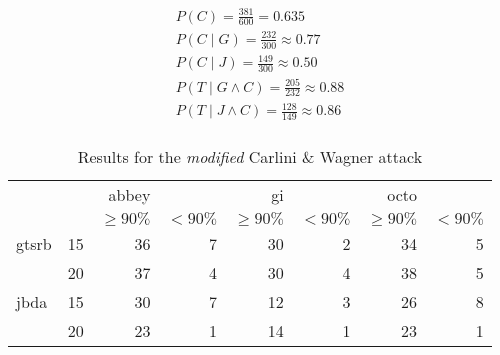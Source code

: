 \begin{align}
P(C) = \frac{381}{600} = 0.635\\[1ex]
P(C \mid G) = \frac{232}{300} \approx 0.77\\[1ex]
P(C \mid J) = \frac{149}{300} \approx 0.50\\[1ex]
P(T \mid G \wedge C) = \frac{205}{232} \approx 0.88\\[1ex]
P(T \mid J \wedge C) = \frac{128}{149} \approx 0.86\\[1ex]
\end{align}

\begin{table}
\begin{tabular}{l l | r r | r r | r r}
& & abbey & & gi & & octo & \\[1ex]
& & \footnotesize$\geq90\%$ & \footnotesize$<90\%$ & \footnotesize$\geq90\%$ & \footnotesize$<90\%$ & \footnotesize$\geq90\%$ & \footnotesize$<90\%$ \\[1ex]
\hline
gtsrb & 15 & 36 & 7 & 30 & 2 & 34 & 5
\\[1ex]
 & 20 & 37 & 4 & 30 & 4 & 38 & 5\\[1ex]
\hline
jbda & 15 & 30 & 7 & 12 & 3 & 26 & 8
\\[1ex]
  & 20 & 23 & 1 & 14 & 1 & 23 & 1\\[1ex]
\end{tabular}
\caption{Results for the \textit{modified} Carlini \& Wagner attack}
\label{tab:robust_result}
\end{table}